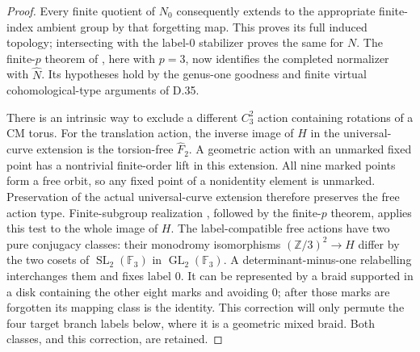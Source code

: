 \begin{proof}
Every finite quotient of $N_0$ consequently extends to the
appropriate finite-index ambient group by that forgetting map.
This proves its full induced topology; intersecting with the
label-$0$ stabilizer proves the same for $N$.
The finite-$p$ theorem of \cite[Theorem A]{ET_BZ2024}, here
with $p=3$, now identifies the completed normalizer with
$\widehat N$.  Its hypotheses hold by the genus-one goodness
and finite virtual cohomological-type arguments of D.35.

There is an intrinsic way to exclude a different $C_3^2$ action
containing rotations of a CM torus.  For the translation action,
the inverse image of $H$ in the universal-curve extension is
the torsion-free $\widehat F_2$.  A geometric action with an
unmarked fixed point has a nontrivial finite-order lift in this
extension.  All nine marked points form a free orbit, so any
fixed point of a nonidentity element is unmarked.  Preservation
of the actual universal-curve extension therefore preserves
the free action type.  Finite-subgroup realization
\cite{ET_Kerckhoff1983}, followed by the finite-$p$ theorem,
applies this test to the whole image of $H$.
The label-compatible free actions have two pure conjugacy
classes: their monodromy isomorphisms
$(\mathbb Z/3)^2\to H$ differ by the two cosets of
$\operatorname{SL}_2(\mathbb F_3)$ in
$\operatorname{GL}_2(\mathbb F_3)$.
A determinant-minus-one relabelling interchanges them and
fixes label $0$.  It can be represented by a braid supported
in a disk containing the other eight marks and avoiding $0$;
after those marks are forgotten its mapping class is the
identity.  This correction will only permute the four
target branch labels below, where it is a geometric mixed
braid.  Both classes, and this correction, are retained.


\end{proof}
